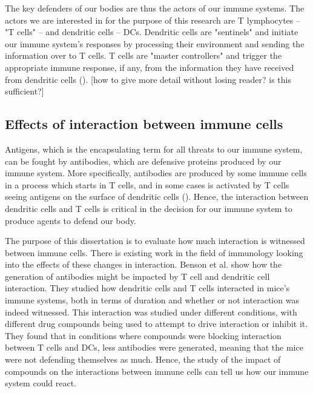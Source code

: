 \documentclass{l4proj}
\begin{document}

The key defenders of our bodies are thus the actors of our immune systems. The actors we are interested in for the purpose of this research are T lymphocytes – "T cells" – and dendritic cells – DCs. Dendritic cells are "sentinels" and initiate our immune system's responses by processing their environment and sending the information over to T cells. T cells are "master controllers" and trigger the appropriate immune response, if any, from the information they have received from dendritic cells (\cite{https://www.immunology.org/public-information/bitesized-immunology/cells/dendritic-cells, https://www.youtube.com/watch?v=hRvyCYyab68}). [how to give more detail without losing reader? is this sufficient?]



\subsection{Effects of interaction between immune cells} \label{bg:interaction}

Antigens, which is the encapsulating term for all threats to our immune system, can be fought by antibodies, which are defensive proteins produced by our immune system. More specifically, antibodies are produced by some immune cells in a process which starts in T cells, and in some cases is activated by T cells seeing antigens on the surface of dendritic cells (\cite{https://elifesciences.org/articles/06994}). Hence, the interaction between dendritic cells and T cells is critical in the decision for our immune system to produce agents to defend our body.

The purpose of this dissertation is to evaluate how much interaction is witnessed between immune cells. There is existing work in the field of immunology looking into the effects of these changes in interaction. Benson et al. show how the generation of antibodies might be impacted by T cell and dendritic cell interaction. They studied how dendritic cells and T cells interacted in mice's immune systems, both in terms of duration and whether or not interaction was indeed witnessed. This interaction was studied under different conditions, with different drug compounds being used to attempt to drive interaction or inhibit it. They found that in conditions where compounds were blocking interaction between T cells and DCs, less antibodies were generated, meaning that the mice were not defending themselves as much. Hence, the study of the impact of compounds on the interactions between immune cells can tell us how our immune system could react.
\end{document}
